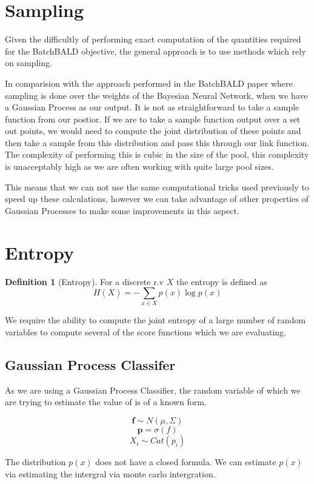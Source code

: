 \documentclass[12pt, a4paper]{report}
\theoremstyle{definition}
\newtheorem{definition}{Definition}[section]
\begin{document}
\section{Sampling}

Given the difficultly of performing exact computation of the quantities required for the BatchBALD objective, the general approach is to use methods which rely on sampling.

In comparision with the approach performed in the BatchBALD paper where sampling is done over the weights of the Bayesian Neural Network, when we have a Gaussian Process as our output. It is not as straightforward to take a sample function from our postior. If we are to take a sample function output over a set out points, we would need to compute the joint distribution of these points and then take a sample from this distribution and pass this through our link function.
The complexity of performing this is cubic in the size of the pool, this complexity is unacceptably high as we are often working with quite large pool sizes.

This means that we can not use the same computational tricks used previously to speed up these calculations, however we can take advantage of other properties of Gaussian Processes to make some improvements in this aspect.


\section{Entropy}

\begin{definition}[Entropy]
    For a discrete r.v $X$ the entropy is defined as $$H(X) = - \sum_{x \in X} p(x) \log p(x) $$
\end{definition}


We require the ability to compute the joint entropy of a large number of random variables to compute several of the score functions which we are evaluating.

\subsection{Gaussian Process Classifer}
As we are using a Gaussian Process Classifier, the random variable of which we are trying to estimate the value of is of a known form.


$$ \mathbf{f} \sim N(\mu, \Sigma) $$
$$ \mathbf{p} =  \sigma \left(f \right) $$
$$ X_i \sim Cat(p_i) $$

The distribution $p(x)$ does not have a closed formula. We can estimate $p(x)$ via estimating the intergral via monte carlo intergration.
\end{document}
